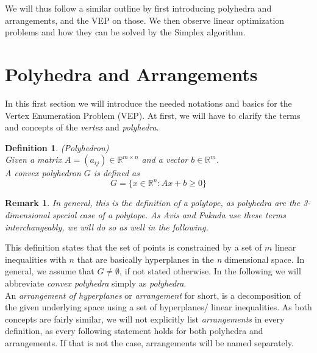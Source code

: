 \documentclass[a4paper, 11pt]{article}
\newtheorem{mydef}{Definition}
\newtheorem*{remark}{Remark}
\begin{document}
We will thus follow a similar outline by first introducing polyhedra and arrangements, and the VEP on those. We then observe linear optimization problems and how they can be solved by the Simplex algorithm.

\section{Polyhedra and Arrangements}
In this first section we will introduce the needed notations and basics for the Vertex Enumeration Problem (VEP). At first, we will have to clarify the terms and concepts of the \textit{vertex} and \textit{polyhedra}.

\begin{mydef}(Polyhedron)\\
	Given a matrix $A=(a_{ij}) \in \mathbb{R}^{m\times n}$ and a vector $b \in \mathbb{R}^m$.\\
	
	A \textit{convex polyhedron} $G$ is defined as
	\begin{equation}
		G = \{ x\in \mathbb{R}^n: Ax+b\geq 0 \}
	\end{equation}
\end{mydef}
\begin{remark}
	
	In general, this is the definition of a polytope, as polyhedra are the 3-dimensional special case of a polytope. As Avis and Fukuda use these terms interchangeably, we will do so as well in the following. 
\end{remark}

This definition states that the set of points is constrained by a set of $m$ linear inequalities with $n$ that are basically hyperplanes in the \textit{n} dimensional space. In general, we assume that $G\neq\emptyset$, if not stated otherwise. In the following we will abbreviate \textit{convex polyhedra} simply as \textit{polyhedra}. \\

An \textit{arrangement of hyperplanes} or \textit{arrangement} for short, is a decomposition of the given underlying space using a set of hyperplanes/ linear inequalities. As both concepts are fairly similar, we will not explicitly list \textit{arrangements} in every definition, as every following statement holds for both polyhedra and arrangements. If that is not the case, arrangements will be named separately.\\
\end{document}
